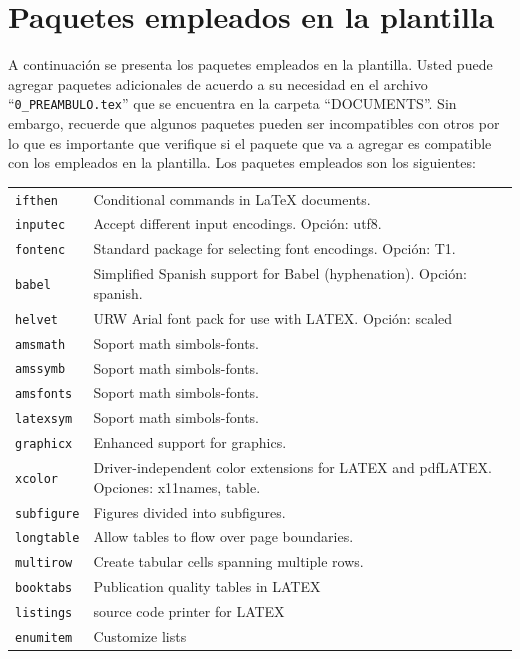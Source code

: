 \section{Paquetes empleados en la plantilla}

A continuación se presenta los paquetes empleados en la plantilla. Usted puede agregar paquetes adicionales de acuerdo a su necesidad en el archivo ``\lstinline|0_PREAMBULO.tex|'' que se encuentra en la carpeta ``DOCUMENTS''. Sin embargo, recuerde que algunos paquetes pueden ser incompatibles con otros por lo que es importante que verifique si el paquete que va a agregar es compatible con los empleados en la plantilla. Los paquetes empleados son los siguientes: 

\begin{longtable}{p{} p{}}
	\texttt{ifthen}  	& Conditional commands in LaTeX documents.  \\  
	\texttt{inputec} 	& Accept different input encodings. Opción: utf8. \\ 
	\texttt{fontenc} 	& Standard package for selecting font encodings. Opción: T1. \\
	\texttt{babel} 	 	& Simplified Spanish support for Babel (hyphenation). Opción: spanish. \\
	\texttt{helvet}  	& URW Arial font pack for use with LATEX. Opción: scaled\\
	\texttt{amsmath} 	& Soport math simbols-fonts. \\
	\texttt{amssymb}    & Soport math simbols-fonts.\\
	\texttt{amsfonts} 	& Soport math simbols-fonts.\\
	\texttt{latexsym} 	& Soport math simbols-fonts.\\
	\texttt{graphicx} 	& Enhanced support for graphics.\\
	\texttt{xcolor} 	& Driver-independent color extensions for LATEX and pdfLATEX. Opciones: x11names, table. \\
	\texttt{subfigure} 	& Figures divided into subfigures. \\
	\texttt{longtable} 	& Allow tables to flow over page boundaries. \\
	\texttt{multirow}  	& Create tabular cells spanning multiple rows. \\
	\texttt{booktabs} 	&  Publication quality tables in LATEX \\
	\texttt{listings} 	& source code printer for LATEX 	 \\
	\texttt{enumitem} 	& Customize lists \\

\end{longtable}
